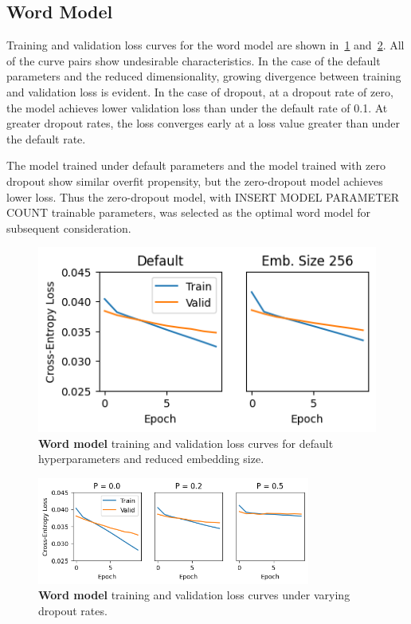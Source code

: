 \documentclass[letterpaper]{article} %
\begin{document}
\begin{NoHyper}
\subsection{Word Model}
\label{subsec:word}

Training and validation loss curves for the word model are shown in~\ref{fig:onemark-loss-df} and~\ref{fig:onemark-loss-dropout}.
All of the curve pairs show undesirable characteristics.
In the case of the default parameters and the reduced dimensionality, growing divergence between training and validation loss is evident.
In the case of dropout, at a dropout rate of zero, the model achieves lower validation loss than under the default rate of 0.1. At greater dropout rates, the loss converges  early at a loss value greater than under the default rate.

The model trained under default parameters and the model trained with zero dropout show similar overfit propensity, but the zero-dropout model achieves lower loss.
Thus the zero-dropout model, with INSERT MODEL PARAMETER COUNT trainable parameters, was selected as the optimal word model for subsequent consideration.

\begin{figure}
\centering
\includegraphics[width=0.9\columnwidth]{fig-onemark-loss-default-and-embsize}
\caption{\textbf{Word model} training and validation loss curves for default hyperparameters and reduced embedding size.}
\label{fig:onemark-loss-df}
\end{figure}

\begin{figure}
\centering
\includegraphics[width=0.8\textwidth]{fig-onemark-loss-dropout}
\caption{\textbf{Word model} training and validation loss curves under varying dropout rates.}
\label{fig:onemark-loss-dropout}
\end{figure}


\end{NoHyper}
\end{document}
